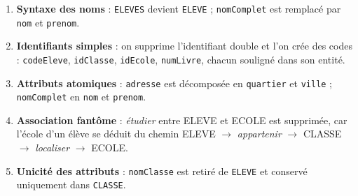 \documentclass[11pt]{article}
\begin{document}
\begin{enumerate}
  \item \textbf{Syntaxe des noms} : \texttt{ELEVES} devient \texttt{ELEVE} ; \texttt{nomComplet} est remplacé par \texttt{nom} et \texttt{prenom}.
  \item \textbf{Identifiants simples} : on supprime l'identifiant double et l'on crée des codes : \texttt{codeEleve}, \texttt{idClasse}, \texttt{idEcole}, \texttt{numLivre}, chacun souligné dans son entité.
  \item \textbf{Attributs atomiques} : \texttt{adresse} est décomposée en \texttt{quartier} et \texttt{ville} ; \texttt{nomComplet} en \texttt{nom} et \texttt{prenom}.
  \item \textbf{Association fantôme} : \emph{étudier} entre ELEVE et ECOLE est supprimée, car l'école d'un élève se déduit du chemin ELEVE $\rightarrow$ \emph{appartenir} $\rightarrow$ CLASSE $\rightarrow$ \emph{localiser} $\rightarrow$ ECOLE.
  \item \textbf{Unicité des attributs} : \texttt{nomClasse} est retiré de \texttt{ELEVE} et conservé uniquement dans \texttt{CLASSE}.
\end{enumerate}
\end{document}
